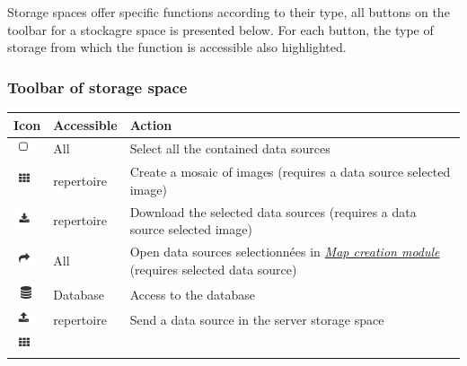 \documentclass[letterpaper,10pt,english]{sphinxmanual}
\begin{document}
Storage spaces offer specific functions according to their type, all buttons on the toolbar for a stockagre space is presented below. For each button, the type of storage from which the function is accessible also highlighted.


\subsubsection{Toolbar of storage space}
\label{data/datastores:barre-d-outils-d-un-espace-de-stockage}
\begin{tabulary}{\linewidth}{|L|L|L|}
\hline

\textbf{Icon}
 & 
\textbf{Accessible}
 & 
\textbf{Action}
\\
\hline
\includegraphics{select.png}
 & 
All
 & 
Select all the contained data sources
\\
\hline
\includegraphics{tile.png}
 & 
repertoire
 & 
Create a mosaic of images (requires a data source selected image)
\\
\hline
\includegraphics{download.png}
 & 
repertoire
 & 
Download the selected data sources (requires a data source selected image)
\\
\hline
\includegraphics{share.png}
 & 
All
 & 
Open data sources selectionnées in {\hyperref[maps/index:maps]{\emph{Map creation module}}} (requires selected data source)
\\
\hline
\includegraphics{database.png}
 & 
Database
 & 
Access to the database
\\
\hline
\includegraphics{upload.png}
 & 
repertoire
 & 
Send a data source in the server storage space
\\
\hline
\includegraphics{tile.png}
 & 

\end{tabulary}
\end{document}
